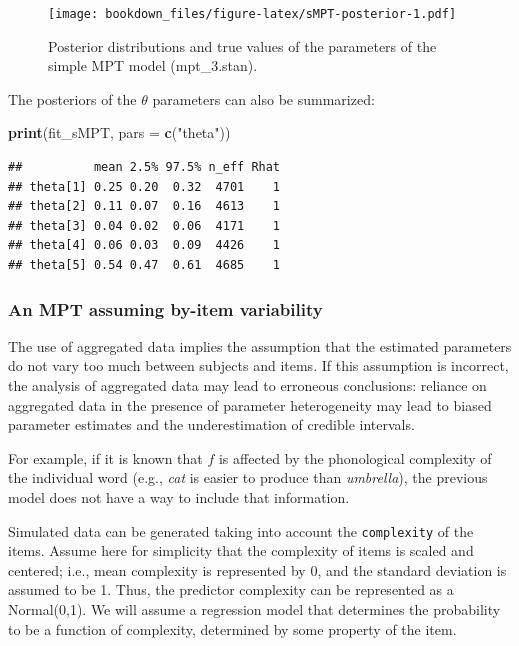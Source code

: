 \documentclass[12pt,]{krantz}
\newenvironment{Shaded}{\begin{snugshade}}{\end{snugshade}}
\newcommand{\DataTypeTok}[1]{\textcolor[rgb]{0.13,0.29,0.53}{#1}}
\newcommand{\KeywordTok}[1]{\textcolor[rgb]{0.13,0.29,0.53}{\textbf{#1}}}
\newcommand{\NormalTok}[1]{#1}
\newcommand{\StringTok}[1]{\textcolor[rgb]{0.31,0.60,0.02}{#1}}
\theoremstyle{definition}
\theoremstyle{definition}
\theoremstyle{definition}
\theoremstyle{remark}
\begin{document}
\begin{figure}
\centering
\texttt{[image: bookdown\_files/figure-latex/sMPT-posterior-1.pdf]}
\caption{\label{fig:sMPT-posterior}Posterior distributions and true values of the parameters of the simple MPT model (mpt\_3.stan).}
\end{figure}

The posteriors of the \(\theta\) parameters can also be summarized:

\begin{Shaded}
\begin{Highlighting}[]
\KeywordTok{print}\NormalTok{(fit_sMPT, }\DataTypeTok{pars =} \KeywordTok{c}\NormalTok{(}\StringTok{"theta"}\NormalTok{))}
\end{Highlighting}
\end{Shaded}

\begin{verbatim}
##          mean 2.5% 97.5% n_eff Rhat
## theta[1] 0.25 0.20  0.32  4701    1
## theta[2] 0.11 0.07  0.16  4613    1
## theta[3] 0.04 0.02  0.06  4171    1
## theta[4] 0.06 0.03  0.09  4426    1
## theta[5] 0.54 0.47  0.61  4685    1
\end{verbatim}

\hypertarget{sec:MPT-reg}{%
\subsubsection{An MPT assuming by-item variability}\label{sec:MPT-reg}}

The use of aggregated data implies the assumption that the estimated parameters do not vary too much between subjects and items. If this assumption is incorrect, the analysis of aggregated data may lead to erroneous conclusions: reliance on aggregated data in the presence of parameter heterogeneity may lead to biased parameter estimates and the underestimation of credible intervals.

For example, if it is known that \(f\) is affected by the phonological complexity of the individual word (e.g., \emph{cat} is easier to produce than \emph{umbrella}), the previous model does not have a way to include that information.

Simulated data can be generated taking into account the \texttt{complexity} of the items. Assume here for simplicity that the complexity of items is scaled and centered; i.e., mean complexity is represented by 0, and the standard deviation is assumed to be 1. Thus, the predictor complexity can be represented as a Normal(0,1). We will assume a regression model that determines the probability to be a function of complexity, determined by some property of the item.
\end{document}
